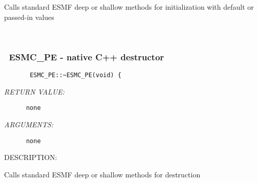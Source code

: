         Calls standard ESMF deep or shallow methods for initialization
        with default or passed-in values
   
 
\mbox{}\hrulefill\ 
 
\subsubsection{~ESMC\_PE - native C++ destructor}


  
\begin{verbatim}       ESMC_PE::~ESMC_PE(void) {\end{verbatim}{\em RETURN VALUE:}
\begin{verbatim}      none\end{verbatim}{\em ARGUMENTS:}
\begin{verbatim}      none\end{verbatim}
{\sf DESCRIPTION:\\ }


        Calls standard ESMF deep or shallow methods for destruction
  
